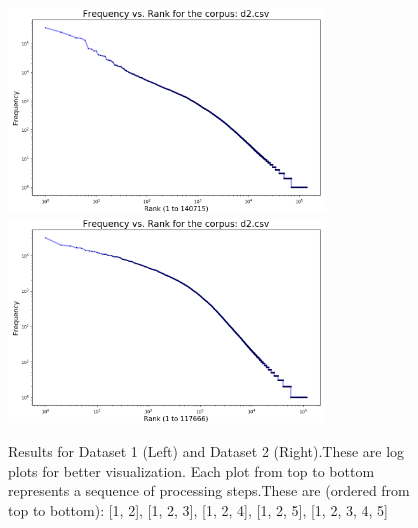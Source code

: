 \documentclass{article}
\begin{document}
\begin{flushleft}
\begin{figure}[H]
\begin{minipage}{0.45\linewidth}
\includegraphics[width=0.75\textwidth]{./images/dataset-2-t1-3.png}
\includegraphics[width=0.75\textwidth]{./images/dataset-2-t1-4.png}
\end{minipage}
\caption{Results for Dataset 1 (Left) and Dataset 2 (Right).\newline{}These are log plots for better visualization. Each plot from top to bottom represents a sequence of processing steps.\newline{}These are (ordered from top to bottom): [1, 2], [1, 2, 3], [1, 2, 4], [1, 2, 5], [1, 2, 3, 4, 5]}
\end{figure}
\end{flushleft}
\end{document}
